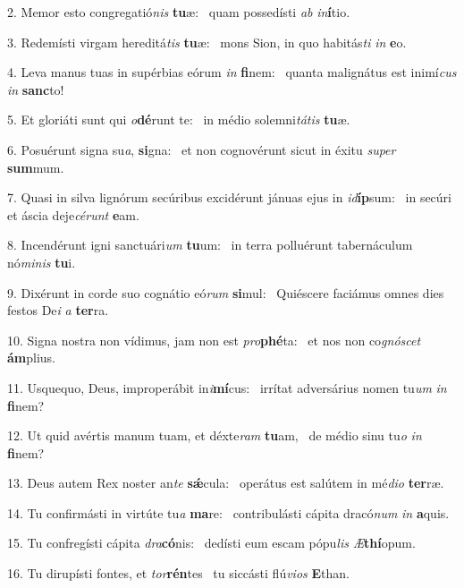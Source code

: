 2. Memor esto congregatió\textit{nis} \textbf{tu}æ: \ast\  quam possedísti \textit{ab} \textit{in}\textbf{í}tio.\

3. Redemísti virgam hereditá\textit{tis} \textbf{tu}æ: \ast\  mons Sion, in quo habitás\textit{ti} \textit{in} \textbf{e}o.\

4. Leva manus tuas in supérbias eórum \textit{in} \textbf{fi}nem: \ast\  quanta malignátus est inimí\textit{cus} \textit{in} \textbf{sanc}to!\

5. Et gloriáti sunt qui \textit{o}\textbf{dé}runt te: \ast\  in médio solemni\textit{tá}\textit{tis} \textbf{tu}æ.\

6. Posuérunt signa su\textit{a}, \textbf{si}gna: \ast\  et non cognovérunt sicut in éxitu \textit{su}\textit{per} \textbf{sum}mum.\

7. Quasi in silva lignórum secúribus excidérunt jánuas ejus in \textit{id}\textbf{íp}sum: \ast\  in secúri et áscia deje\textit{cé}\textit{runt} \textbf{e}am.\

8. Incendérunt igni sanctuári\textit{um} \textbf{tu}um: \ast\  in terra polluérunt tabernáculum nó\textit{mi}\textit{nis} \textbf{tu}i.\

9. Dixérunt in corde suo cognátio eó\textit{rum} \textbf{si}mul: \ast\  Quiéscere faciámus omnes dies festos De\textit{i} \textit{a} \textbf{ter}ra.\

10. Signa nostra non vídimus, jam non est \textit{pro}\textbf{phé}ta: \ast\  et nos non co\textit{gnó}\textit{scet} \textbf{ám}plius.\

11. Usquequo, Deus, improperábit in\textit{i}\textbf{mí}cus: \ast\  irrítat adversárius nomen tu\textit{um} \textit{in} \textbf{fi}nem?\

12. Ut quid avértis manum tuam, et déxte\textit{ram} \textbf{tu}am, \ast\  de médio sinu tu\textit{o} \textit{in} \textbf{fi}nem?\

13. Deus autem Rex noster an\textit{te} \textbf{sǽ}cula: \ast\  operátus est salútem in mé\textit{di}\textit{o} \textbf{ter}ræ.\

14. Tu confirmásti in virtúte tu\textit{a} \textbf{ma}re: \ast\  contribulásti cápita dracó\textit{num} \textit{in} \textbf{a}quis.\

15. Tu confregísti cápita \textit{dra}\textbf{có}nis: \ast\  dedísti eum escam pópu\textit{lis} \textit{Æ}\textbf{thí}opum.\

16. Tu dirupísti fontes, et \textit{tor}\textbf{rén}tes \ast\  tu siccásti flú\textit{vi}\textit{os} \textbf{E}than.\

